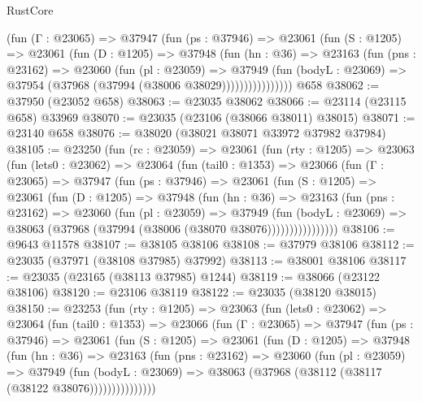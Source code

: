 \begin{lexlean}{RustCore}
\begin{coremodule}
              (fun (Γ : @23065) =>
              @37947
                (fun (ps : @37946) =>
                @23061
                  (fun (S : @1205) =>
                  @23061
                    (fun (D : @1205) =>
                    @37948
                      (fun (hn : @36) =>
                      @23163
                        (fun (pns : @23162) =>
                        @23060
                          (fun (pl : @23059) =>
                          @37949
                            (fun (bodyL : @23069) =>
                            @37954 (@37968 (@37994 (@38006 @38029))))))))))))))))
    @658
@38062 := @37950 (@23052 @658)
@38063 := @23035 @38062
@38066 := @23114 (@23115 @658) @33969
@38070 := @23035 (@23106 (@38066 @38011) @38015)
@38071 := @23140 @658
@38076 := @38020 (@38021 @38071 @33972 @37982 @37984)
@38105 := @23250
    (fun (rc : @23059) =>
    @23061
      (fun (rty : @1205) =>
      @23063
        (fun (lets0 : @23062) =>
        @23064
          (fun (tail0 : @1353) =>
          @23066
            (fun (Γ : @23065) =>
            @37947
              (fun (ps : @37946) =>
              @23061
                (fun (S : @1205) =>
                @23061
                  (fun (D : @1205) =>
                  @37948
                    (fun (hn : @36) =>
                    @23163
                      (fun (pns : @23162) =>
                      @23060
                        (fun (pl : @23059) =>
                        @37949
                          (fun (bodyL : @23069) =>
                          @38063 (@37968 (@37994 (@38006 (@38070 @38076))))))))))))))))
@38106 := @9643 @11578
@38107 := @38105 @38106
@38108 := @37979 @38106
@38112 := @23035 (@37971 (@38108 @37985) @37992)
@38113 := @38001 @38106
@38117 := @23035 (@23165 (@38113 @37985) @1244)
@38119 := @38066 (@23122 @38106)
@38120 := @23106 @38119
@38122 := @23035 (@38120 @38015)
@38150 := @23253
    (fun (rty : @1205) =>
    @23063
      (fun (lets0 : @23062) =>
      @23064
        (fun (tail0 : @1353) =>
        @23066
          (fun (Γ : @23065) =>
          @37947
            (fun (ps : @37946) =>
            @23061
              (fun (S : @1205) =>
              @23061
                (fun (D : @1205) =>
                @37948
                  (fun (hn : @36) =>
                  @23163
                    (fun (pns : @23162) =>
                    @23060
                      (fun (pl : @23059) =>
                      @37949
                        (fun (bodyL : @23069) =>
                        @38063 (@37968 (@38112 (@38117 (@38122 @38076)))))))))))))))

\end{coremodule}
\end{lexlean}

